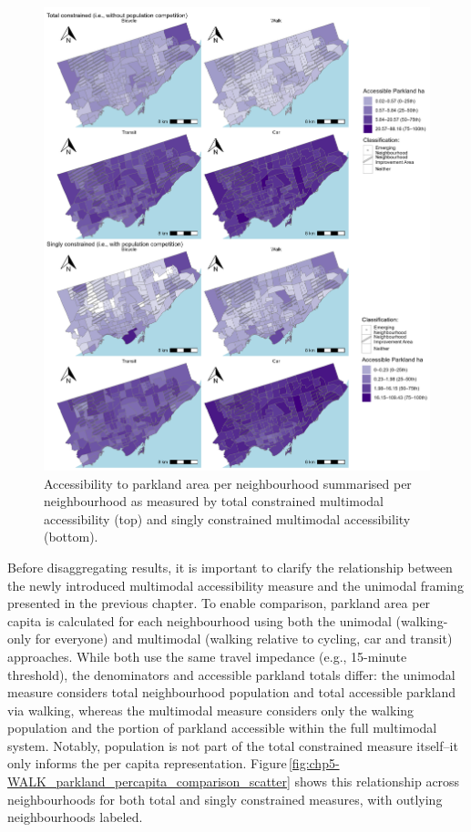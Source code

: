 \documentclass[
11pt, %
oneside, %
english, %
singlespacing, %
]{macthesis} %
\begin{document}
\begin{figure}

{\centering \includegraphics[width=6in]{./data/figures/chp5-mm_parkland_total_singly_access_neigh_plots} 

}

\caption{\label{fig:chp5-mm_parkland_total_singly_access_neigh_plots}Accessibility to parkland area per neighbourhood summarised per neighbourhood as measured by total constrained multimodal accessibility (top) and singly constrained multimodal accessibility (bottom).}\label{fig:unnamed-chunk-79}
\end{figure}

Before disaggregating results, it is important to clarify the relationship between the newly introduced multimodal accessibility measure and the unimodal framing presented in the previous chapter. To enable comparison, parkland area per capita is calculated for each neighbourhood using both the unimodal (walking-only for everyone) and multimodal (walking relative to cycling, car and transit) approaches. While both use the same travel impedance (e.g., 15-minute threshold), the denominators and accessible parkland totals differ: the unimodal measure considers total neighbourhood population and total accessible parkland via walking, whereas the multimodal measure considers only the walking population and the portion of parkland accessible within the full multimodal system. Notably, population is not part of the total constrained measure itself--it only informs the per capita representation. Figure\,\ref{fig:chp5-WALK_parkland_percapita_comparison_scatter} shows this relationship across neighbourhoods for both total and singly constrained measures, with outlying neighbourhoods labeled.
\end{document}
